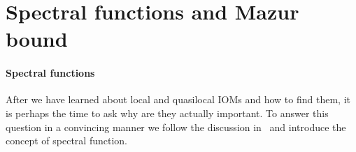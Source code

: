 
\section{Spectral functions and Mazur bound\label{sec:spectral function}}

\paragraph{Spectral functions}After we have learned about local and quasilocal IOMs and how to find them, it is perhaps the 
time to ask why are they actually important. To answer this question in a convincing manner we 
follow the discussion in~\textcite{Vidmar2021} and introduce the concept of spectral
function. 

